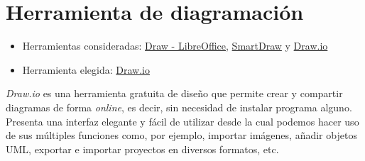 \section{Herramienta de diagramación}\label{int-cont}

\begin{itemize}
\tightlist
	\item Herramientas consideradas:
  		\href{https://es.libreoffice.org/descubre/draw/}{Draw - LibreOffice},
  		\href{https://www.smartdraw.com/} {SmartDraw} y
  		\href{https://app.diagrams.net/} {Draw.io}
	\item Herramienta elegida:
  		\href{https://app.diagrams.net/}{Draw.io}
\end{itemize}

\emph{Draw.io} es una herramienta gratuita de diseño que permite crear y compartir diagramas de forma \emph{online}, es decir, sin necesidad de instalar programa alguno. Presenta una interfaz elegante y fácil de utilizar desde la cual podemos hacer uso de sus múltiples funciones como, por ejemplo, importar imágenes, añadir objetos UML, exportar e importar proyectos en diversos formatos, etc.




























